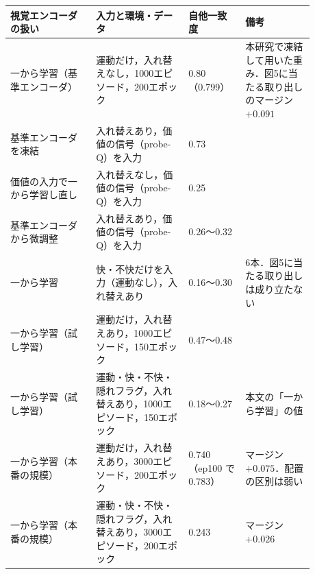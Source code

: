 \begin{tabular}{@{}p{0.25\linewidth}p{0.27\linewidth}p{0.16\linewidth}p{0.2\linewidth}@{}}
\toprule
視覚エンコーダの扱い & 入力と環境・データ & 自他一致度 & 備考 \\
\midrule
一から学習（基準エンコーダ） & 運動だけ，入れ替えなし，1000エピソード，200エポック & 0.80（0.799） & 本研究で凍結して用いた重み．図5に当たる取り出しのマージン $+0.091$ \\
基準エンコーダを凍結 & 入れ替えあり，価値の信号（probe-Q）を入力 & 0.73 & \\
価値の入力で一から学習し直し & 入れ替えなし，価値の信号（probe-Q）を入力 & 0.25 & \\
基準エンコーダから微調整 & 入れ替えあり，価値の信号（probe-Q）を入力 & 0.26〜0.32 & \\
一から学習 & 快・不快だけを入力（運動なし），入れ替えあり & 0.16〜0.30 & 6本．図5に当たる取り出しは成り立たない \\
一から学習（試し学習） & 運動だけ，入れ替えあり，1000エピソード，150エポック & 0.47〜0.48 & \\
一から学習（試し学習） & 運動・快・不快・隠れフラグ，入れ替えあり，1000エピソード，150エポック & 0.18〜0.27 & 本文の「一から学習」の値 \\
一から学習（本番の規模） & 運動だけ，入れ替えあり，3000エピソード，200エポック & 0.740（ep100 で 0.783） & マージン $+0.075$．配置の区別は弱い \\
一から学習（本番の規模） & 運動・快・不快・隠れフラグ，入れ替えあり，3000エピソード，200エポック & 0.243 & マージン $+0.026$ \\
\bottomrule
\end{tabular}
